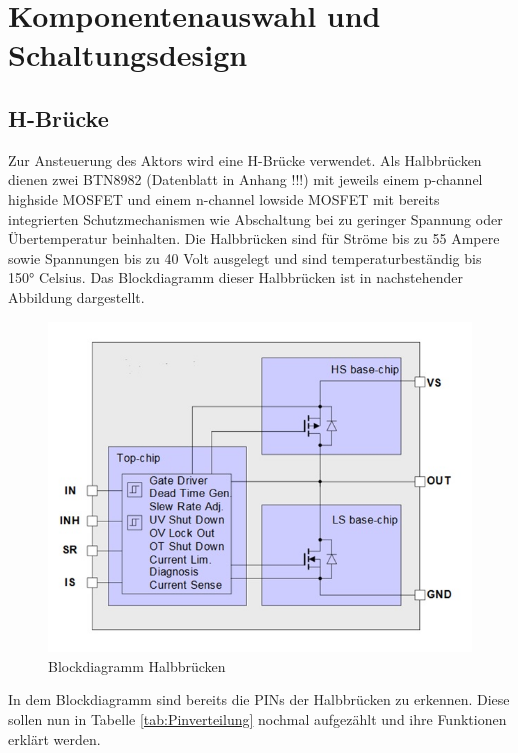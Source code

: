 \chapter{Komponentenauswahl und Schaltungsdesign}
\section{H-Brücke}
Zur Ansteuerung des Aktors wird eine H-Brücke verwendet. 
Als Halbbrücken dienen zwei BTN8982 (Datenblatt in Anhang !!!) mit jeweils einem p-channel highside MOSFET und einem n-channel lowside MOSFET mit bereits integrierten Schutzmechanismen wie Abschaltung bei zu geringer Spannung oder Übertemperatur beinhalten.  Die Halbbrücken sind für Ströme bis zu 55 Ampere sowie Spannungen bis zu 40 Volt ausgelegt und sind temperaturbeständig bis 150° Celsius. Das Blockdiagramm dieser Halbbrücken ist in nachstehender Abbildung dargestellt.
\begin{figure}[h]
	\centering
		\includegraphics{Bilder/Blockdiagramm Halbbruecken.jpg}
	\caption{Blockdiagramm Halbbrücken}
	\label{fig:Blockdiagramm Halbbruecken}
\end{figure}
In dem Blockdiagramm sind bereits die PINs der Halbbrücken zu erkennen. Diese sollen nun in Tabelle \ref{tab:Pinverteilung} nochmal aufgezählt und ihre Funktionen erklärt werden. 

